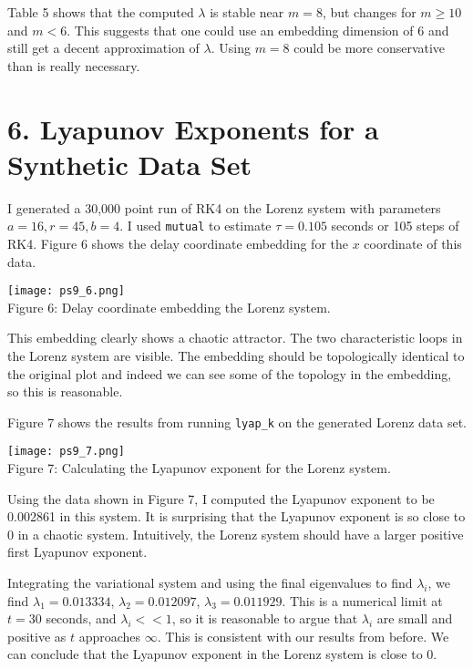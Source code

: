 \documentclass[12pt, letterpaper]{article}
\begin{document}
Table 5 shows that the computed $\lambda$ is stable near $m=8$, but changes
for $m \geq 10$ and $m < 6$. This suggests that one could use an embedding
dimension of 6 and still get a decent approximation of $\lambda$. Using $m=8$ 
could be more conservative than is really necessary. 

\newpage
\section*{6. Lyapunov Exponents for a Synthetic Data Set}

I generated a 30,000 point run of RK4 on the Lorenz system with parameters
$a=16, r=45, b=4$. I used \texttt{mutual} to estimate $\tau=0.105$ seconds or
105 steps of RK4. Figure 6 shows the delay coordinate embedding for the $x$
coordinate of this data.

\begin{center}
\texttt{[image: ps9\_6.png]}
\\
Figure 6: Delay coordinate embedding the Lorenz system.
\end{center}

This embedding clearly shows a chaotic attractor. The two characteristic loops
in the Lorenz system are visible. The embedding should be topologically identical
to the original plot and indeed we can see some of the topology in the embedding,
so this is reasonable. 

Figure 7 shows the results from running \texttt{lyap\_k} on the generated Lorenz
data set.

\begin{center}
\texttt{[image: ps9\_7.png]}
\\
Figure 7: Calculating the Lyapunov exponent for the Lorenz system.
\end{center}

Using the data shown in Figure 7, I computed the Lyapunov exponent to be 0.002861
in this system. It is surprising that the Lyapunov exponent is so close to 0 in
a chaotic system. Intuitively, the Lorenz system should have a larger positive
first Lyapunov exponent. 

Integrating the variational system and using the final eigenvalues to find
$\lambda_i$, we find $\lambda_1=0.013334$, $\lambda_2=0.012097$, 
$\lambda_3=0.011929$. This is a numerical limit at $t=30$ seconds, and 
$\lambda_i << 1$, so it is reasonable to argue that $\lambda_i$ are small and 
positive as $t$ approaches $\infty$. This is consistent with our results from 
before. We can conclude that the Lyapunov exponent in the Lorenz system is close 
to 0.
\end{document}
